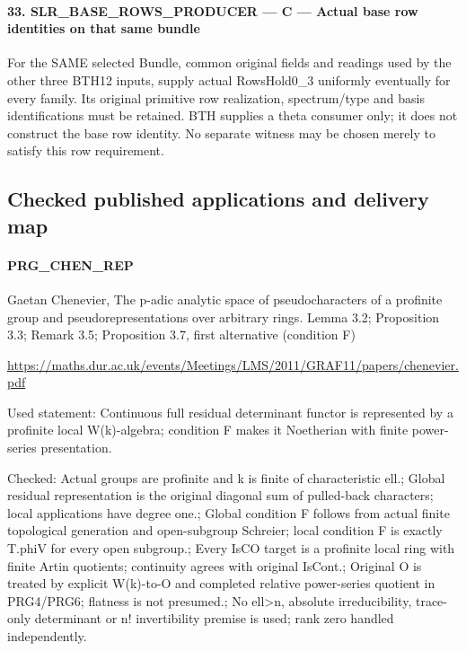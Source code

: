 \paragraph{33. SLR\_\allowbreak{}BASE\_\allowbreak{}ROWS\_\allowbreak{}PRODUCER — C — Actual base row identities on that same bundle}

For the SAME selected Bundle, common original fields and readings used by the other three BTH12 inputs, supply actual RowsHold0\_\allowbreak{}3 uniformly eventually for every family. Its original primitive row realization, spectrum/\allowbreak{}type and basis identifications must be retained. BTH supplies a theta consumer only; it does not construct the base row identity. No separate witness may be chosen merely to satisfy this row requirement.

\subsection{Checked published applications and delivery map}

\paragraph{PRG\_\allowbreak{}CHEN\_\allowbreak{}REP}Gaetan Chenevier, The p-adic analytic space of pseudocharacters of a profinite group and pseudorepresentations over arbitrary rings. Lemma 3.2; Proposition 3.3; Remark 3.5; Proposition 3.7, first alternative (condition F)

\url{https://maths.dur.ac.uk/events/Meetings/LMS/2011/GRAF11/papers/chenevier.pdf}

Used statement: Continuous full residual determinant functor is represented by a profinite local W(k)-algebra; condition F makes it Noetherian with finite power-series presentation.

Checked: Actual groups are profinite and k is finite of characteristic ell.; Global residual representation is the original diagonal sum of pulled-back characters; local applications have degree one.; Global condition F follows from actual finite topological generation and open-subgroup Schreier; local condition F is exactly T.phiV for every open subgroup.; Every IsCO target is a profinite local ring with finite Artin quotients; continuity agrees with original IsCont.; Original O is treated by explicit W(k)-to-O and completed relative power-series quotient in PRG4/\allowbreak{}PRG6; flatness is not presumed.; No ell>n, absolute irreducibility, trace-only determinant or n! invertibility premise is used; rank zero handled independently.

